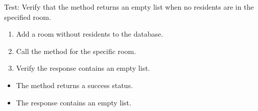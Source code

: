 \documentclass[letterpaper,10pt,english]{sphinxmanual}
\begin{document}
\begin{fulllineitems}
\label{\detokenize{test:test.test_residetnt.test_list_residents_in_room_no_residents}}
\pysigstartsignatures
\pysiglinewithargsret
{}
{}
{}
\pysigstopsignatures
\sphinxAtStartPar
Test: Verify that the method returns an empty list when no residents are in the specified room.
\begin{description}
\begin{enumerate}
%
\item {} 
\sphinxAtStartPar
Add a room without residents to the database.

\item {} 
\sphinxAtStartPar
Call the  method for the specific room.

\item {} 
\sphinxAtStartPar
Verify the response contains an empty list.

\end{enumerate}

\begin{itemize}
\item {} 
\sphinxAtStartPar
The method returns a success status.

\item {} 
\sphinxAtStartPar
The response contains an empty list.

\end{itemize}

\end{description}

\end{fulllineitems}

\end{document}
